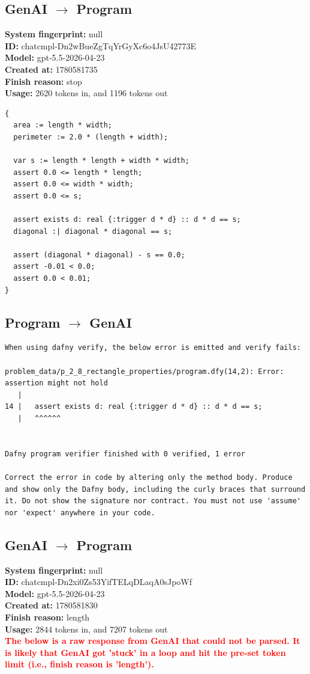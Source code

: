 \documentclass{article}
\begin{document}
\subsection*{GenAI $\rightarrow$ Program}
\textbf{System fingerprint: }null
\\\textbf{ID: }chatcmpl-Dn2wBueZgTqYrGyXc6o4JsU42773E
\\\textbf{Model: }gpt-5.5-2026-04-23
\\\textbf{Created at: }1780581735
\\\textbf{Finish reason: }stop
\\\textbf{Usage: }2620 tokens in, and 1196 tokens out
\begin{lstlisting}
{
  area := length * width;
  perimeter := 2.0 * (length + width);

  var s := length * length + width * width;
  assert 0.0 <= length * length;
  assert 0.0 <= width * width;
  assert 0.0 <= s;

  assert exists d: real {:trigger d * d} :: d * d == s;
  diagonal :| diagonal * diagonal == s;

  assert (diagonal * diagonal) - s == 0.0;
  assert -0.01 < 0.0;
  assert 0.0 < 0.01;
}
\end{lstlisting}
\subsection*{Program $\rightarrow$ GenAI}
\begin{lstlisting}
When using dafny verify, the below error is emitted and verify fails:

problem_data/p_2_8_rectangle_properties/program.dfy(14,2): Error: assertion might not hold
   |
14 |   assert exists d: real {:trigger d * d} :: d * d == s;
   |   ^^^^^^


Dafny program verifier finished with 0 verified, 1 error

Correct the error in code by altering only the method body. Produce and show only the Dafny body, including the curly braces that surround it. Do not show the signature nor contract. You must not use 'assume' nor 'expect' anywhere in your code.
\end{lstlisting}
\subsection*{GenAI $\rightarrow$ Program}
\textbf{System fingerprint: }null
\\\textbf{ID: }chatcmpl-Dn2xi0Zs53YifTELqDLaqA0sJpoWf
\\\textbf{Model: }gpt-5.5-2026-04-23
\\\textbf{Created at: }1780581830
\\\textbf{Finish reason: }length
\\\textbf{Usage: }2844 tokens in, and 7207 tokens out
\\\textcolor{red}{\textbf{The below is a raw response from GenAI that could not be parsed. It is likely that GenAI got 'stuck' in a loop and hit the pre-set token limit (i.e., finish reason is 'length').}}
\begin{lstlisting}

\end{lstlisting}
\end{document}
